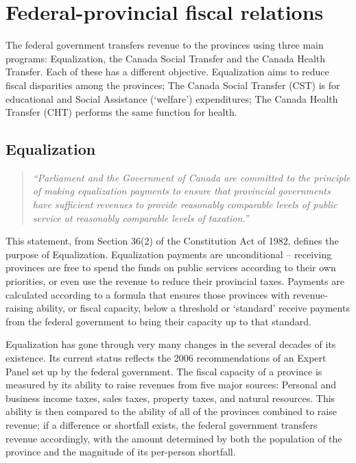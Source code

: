 \section{Federal-provincial fiscal relations}\label{sec:ch14sec3}

The federal government transfers revenue to the provinces using three main
programs: Equalization, the Canada Social Transfer and the Canada Health
Transfer. Each of these has a different objective. Equalization aims to
reduce fiscal disparities among the provinces; The Canada Social Transfer
(CST) is for educational and Social Assistance (`welfare') expenditures; The
Canada Health Transfer (CHT) performs the same function for health.

\subsection*{Equalization}

\begin{quote}
	\textit{``Parliament and the Government of Canada are committed to the
		principle of making equalization payments to ensure that provincial
		governments have sufficient revenues to provide reasonably comparable levels
		of public service at reasonably comparable levels of taxation.''}
\end{quote}

This statement, from Section 36(2) of the Constitution Act of 1982, defines
the purpose of Equalization. Equalization payments are unconditional --
receiving provinces are free to spend the funds on public services according
to their own priorities, or even use the revenue to reduce their provincial
taxes. Payments are calculated according to a formula that ensures those
provinces with revenue-raising ability, or fiscal capacity, below a
threshold or `standard' receive payments from the federal government to
bring their capacity up to that standard.

Equalization has gone through very many changes in the several decades of
its existence. Its current status reflects the 2006 recommendations of an
Expert Panel set up by the federal government. The fiscal capacity of a
province is measured by its ability to raise revenues from five major
sources: Personal and business income taxes, sales taxes, property taxes,
and natural resources. This ability is then compared to the ability of all
of the provinces combined to raise revenue; if a difference or shortfall
exists, the federal government transfers revenue accordingly, with the
amount determined by both the population of the province and the magnitude
of its per-person shortfall.

